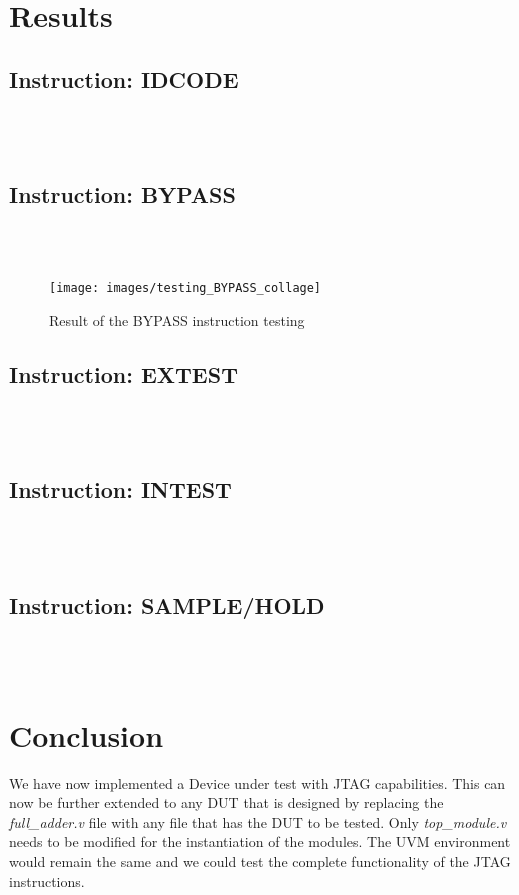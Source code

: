 \documentclass[a4paper,11pt]{article}
\begin{document}
\section{Results}
\subsection{Instruction: IDCODE}
\ \\
\ \\
\subsection{Instruction: BYPASS}
\ \\
\ \\
\begin{figure}[ht]
\centering
\texttt{[image: images/testing\_BYPASS\_collage]}
\caption{Result of the BYPASS instruction testing}
\end{figure}

\FloatBarrier
\subsection{Instruction: EXTEST}
\ \\
\ \\

\subsection{Instruction: INTEST}
\ \\
\ \\

\subsection{Instruction: SAMPLE/HOLD}
\ \\
\ \\


\newpage
\pagebreak
\section{Conclusion}

We have now implemented a Device under test with JTAG capabilities. This can now be further extended to any DUT that is designed by replacing the \textit{full\_adder.v} file with any file that has the DUT to be tested. Only \textit{top\_module.v} needs to be modified for the instantiation of the modules. The UVM environment would remain the same and we could test the complete functionality of the JTAG instructions.
\end{document}
